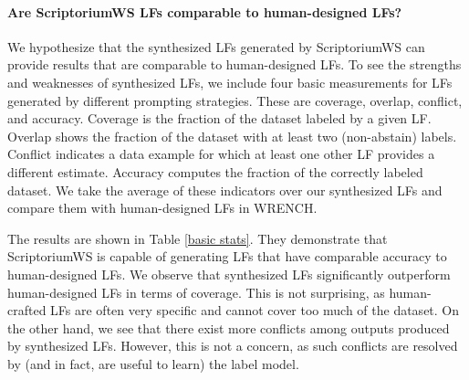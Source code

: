 \paragraph{Are ScriptoriumWS LFs comparable to human-designed LFs?}
We hypothesize that the synthesized LFs generated by ScriptoriumWS can provide results that are comparable to human-designed LFs. 
To see the strengths and weaknesses of synthesized LFs, we include four basic measurements for LFs generated by different prompting strategies.
These are coverage, overlap, conflict, and accuracy. 
Coverage is the fraction of the dataset labeled by a given LF. 
Overlap shows the fraction of the dataset with at least two (non-abstain) labels. 
Conflict indicates a data example for which at least one other LF provides a different estimate. 
Accuracy computes the fraction of the correctly labeled dataset. 
We take the average of these indicators over our synthesized LFs and compare them with human-designed LFs in WRENCH. 

The results are shown in Table \ref{basic stats}. 
They demonstrate that ScriptoriumWS is capable of generating LFs that have comparable accuracy to human-designed LFs. 
We observe that synthesized LFs significantly outperform human-designed LFs in terms of coverage. This is not surprising, as human-crafted LFs are often very specific and cannot cover too much of the dataset.  
On the other hand, we see that there exist more conflicts among outputs produced by synthesized LFs. 
However, this is not a concern, as such conflicts are resolved by (and in fact, are useful to learn) the label model.


